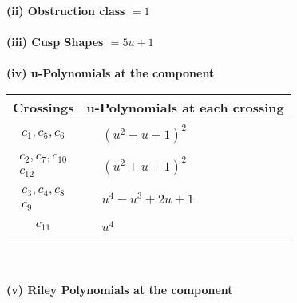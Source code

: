 \documentclass[1p]{elsarticle_modified}
\theoremstyle{definition}
\begin{document}
\flushleft \textbf{(ii) Obstruction class $= 1$}\\~\\
\flushleft \textbf{(iii) Cusp Shapes $= 5 u+1$}\\~\\
\newpage\renewcommand{\arraystretch}{1}
\flushleft \textbf{(iv) u-Polynomials at the component}\newline \\
\begin{tabular}{m{50pt}|m{274pt}}
Crossings & \hspace{64pt}u-Polynomials at each crossing \\
\hline $$\begin{aligned}c_{1},c_{5},c_{6}\end{aligned}$$&$\begin{aligned}
&(u^2- u+1)^2
\end{aligned}$\\
\hline $$\begin{aligned}c_{2},c_{7},c_{10}\\c_{12}\end{aligned}$$&$\begin{aligned}
&(u^2+u+1)^2
\end{aligned}$\\
\hline $$\begin{aligned}c_{3},c_{4},c_{8}\\c_{9}\end{aligned}$$&$\begin{aligned}
&u^4- u^3+2 u+1
\end{aligned}$\\
\hline $$\begin{aligned}c_{11}\end{aligned}$$&$\begin{aligned}
&u^4
\end{aligned}$\\
\hline
\end{tabular}\\~\\
\newpage\renewcommand{\arraystretch}{1}
\flushleft \textbf{(v) Riley Polynomials at the component}\newline \\
\end{document}
